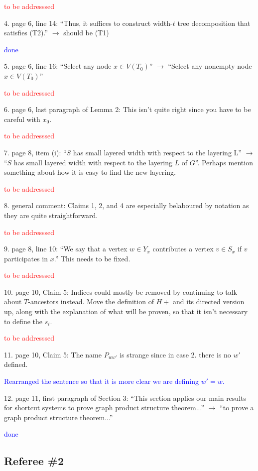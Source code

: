 \documentclass[12pt]{article}
\newcommand{\done}{\textcolor{blue}{done}}
\newcommand{\tba}{\textcolor{red}{to be addresssed}}
\begin{document}
\tba

4. page 6, line 14: ``Thus, it suffices to construct width-$t$ tree decomposition that satisfies (T2).'' $\longrightarrow$ should be (T1)

\done

5. page 6, line 16: ``Select any node $x \in V (T_0)$'' $\longrightarrow$ ``Select any nonempty node $x \in V (T_0)$''

\tba

6. page 6, last paragraph of Lemma 2: This isn’t quite right since you
have to be careful with $x_0$.

\tba

7. page 8, item (i): ``$S$ has small layered width with respect to the layering
L'' $\longrightarrow$ ``$S$ has small layered width with respect to the layering $L$ of
$G$''. Perhaps mention something about how it is easy to find the new layering.

\tba

8. general comment: Claims 1, 2, and 4 are especially belaboured by
notation as they are quite straightforward.

\tba

9. page 8, line 10: ``We say that a vertex $w \in Y_x$ contributes a vertex
$v \in S_x$ if $v$ participates in $x$.'' This needs to be fixed.

\tba

10. page 10, Claim 5: Indices could mostly be removed by continuing
to talk about $T$-ancestors instead. Move the definition of $H+$ and its
directed version up, along with the explanation of what will be proven,
so that it isn’t necessary to define the $s_i$.

\tba

11. page 10, Claim 5: The name $P_{ww'}$ is strange since in case 2. there is
no $w'$ defined.

\textcolor{blue}{Rearranged the sentence so that it is more clear we are defining $w'=w$. }

12. page 11, first paragraph of Section 3: ``This section applies our main results for shortcut systems to prove graph product structure theorem...'' $\longrightarrow$ ``to prove a graph product structure theorem...''

\done

\subsection*{Referee \#2}
\end{document}

